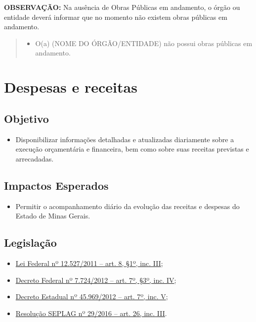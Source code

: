 \documentclass[]{book}
\providecommand{\tightlist}{%
  \setlength{\itemsep}{0pt}\setlength{\parskip}{0pt}}
\begin{document}
\textbf{OBSERVAÇÃO:} Na ausência de Obras Públicas em andamento, o órgão ou entidade deverá informar que no momento não existem obras públicas em andamento.

\begin{quote}
\begin{itemize}
\tightlist
\item
  O(a) (NOME DO ÓRGÃO/ENTIDADE) não possui obras públicas em andamento.
\end{itemize}
\end{quote}

\hypertarget{despesas-e-receitas}{%
\section{Despesas e receitas}\label{despesas-e-receitas}}

\hypertarget{objetivo-4}{%
\subsection{Objetivo}\label{objetivo-4}}

\begin{itemize}
\tightlist
\item
  Disponibilizar informações detalhadas e atualizadas diariamente sobre a execução orçamentária e financeira, bem como sobre suas receitas previstas e arrecadadas.
\end{itemize}

\hypertarget{impactos-esperados-5}{%
\subsection{Impactos Esperados}\label{impactos-esperados-5}}

\begin{itemize}
\tightlist
\item
  Permitir o acompanhamento diário da evolução das receitas e despesas do Estado de Minas Gerais.
\end{itemize}

\hypertarget{legislauxe7uxe3o-5}{%
\subsection{Legislação}\label{legislauxe7uxe3o-5}}

\begin{itemize}
\tightlist
\item
  \href{http://www.planalto.gov.br/ccivil_03/_ato2011-2014/2011/lei/l12527.htm\#art8}{Lei Federal nº 12.527/2011 -- art. 8, §1º, inc. III};
\item
  \href{http://www.planalto.gov.br/ccivil_03/_ato2011-2014/2012/decreto/d7724.htm\#art7}{Decreto Federal nº 7.724/2012 -- art. 7º, §3º, inc. IV};
\item
  \href{https://www.almg.gov.br/consulte/legislacao/completa/completa.html?tipo=DEC\&num=45969\&ano=2012}{Decreto Estadual nº 45.969/2012 -- art. 7º, inc. V};
\item
  \href{http://www.planejamento.mg.gov.br/sites/default/files/documentos/resolucao_sitios_seplag_29_de_05_07_2016_1.pdf}{Resolução SEPLAG nº 29/2016 -- art. 26, inc. III}.
\end{itemize}
\end{document}
